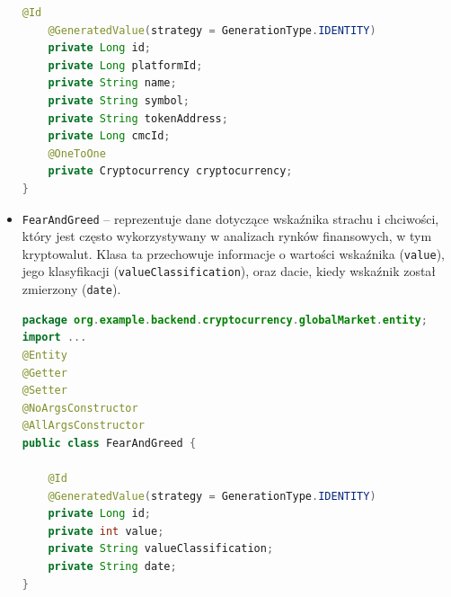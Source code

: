 \begin{itemize}
\begin{lstlisting}[language=Java, style=JavaStyle]
	@Id
	@GeneratedValue(strategy = GenerationType.IDENTITY)
	private Long id;
	private Long platformId;
	private String name;
	private String symbol;
	private String tokenAddress;
	private Long cmcId;
	@OneToOne
	private Cryptocurrency cryptocurrency;
}
\end{lstlisting}
\item \texttt{FearAndGreed} -- reprezentuje dane dotyczące wskaźnika strachu i chciwości, który jest często wykorzystywany w analizach rynków finansowych, w tym kryptowalut. Klasa ta przechowuje informacje o wartości wskaźnika (\texttt{value}), jego klasyfikacji (\texttt{valueClassification}), oraz dacie, kiedy wskaźnik został zmierzony (\texttt{date}).
\begin{lstlisting}[language=Java, style=JavaStyle]
package org.example.backend.cryptocurrency.globalMarket.entity;
import ...
@Entity
@Getter
@Setter
@NoArgsConstructor
@AllArgsConstructor
public class FearAndGreed {

	@Id
	@GeneratedValue(strategy = GenerationType.IDENTITY)
	private Long id;
	private int value;
	private String valueClassification;
	private String date;
}
\end{lstlisting}
\end{itemize}

